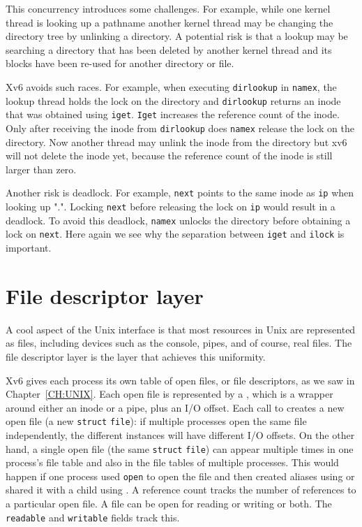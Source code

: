This concurrency introduces some challenges. For example, while one kernel
thread is looking up a pathname another kernel thread may be changing the
directory tree by unlinking a directory.  A potential risk is that a lookup
may be searching a directory that has been deleted by another kernel thread and
its blocks have been re-used for another directory or file.

Xv6 avoids such races.  For example, when executing
\lstinline{dirlookup}
in
\lstinline{namex},
the lookup thread holds the lock on the directory and
\lstinline{dirlookup}
returns an inode that was obtained using
\lstinline{iget}.
\lstinline{Iget}
increases the reference count of the inode.  Only after receiving the
inode from
\lstinline{dirlookup}
does
\lstinline{namex}
release the lock on the directory.  Now another thread may unlink the inode from
the directory but xv6 will not delete the inode yet, because the reference count
of the inode is still larger than zero.

Another risk is deadlock.  For example,
\lstinline{next}
points to the same inode as
\lstinline{ip}
when looking up ".".
Locking
\lstinline{next}
before releasing the lock on
\lstinline{ip}
would result in a deadlock.
To avoid this deadlock,
\lstinline{namex}
unlocks the directory before obtaining a lock on
\lstinline{next}.
Here again we see why the separation between
\lstinline{iget}
and
\lstinline{ilock}
is important.
\section{File descriptor layer}

A cool aspect of the Unix interface is that most resources in Unix are
represented as files, including devices such as the console, pipes, and of
course, real files.  The file descriptor layer is the layer that achieves this
uniformity.

Xv6 gives each process its own table of open files, or
file descriptors, as we saw in
Chapter~\ref{CH:UNIX}.
Each open file is represented by a
,
which is a wrapper around either an inode or a pipe,
plus an I/O offset.
Each call to 
creates a new open file (a new
\lstinline{struct}
\lstinline{file}):
if multiple processes open the same file independently,
the different instances will have different I/O offsets.
On the other hand, a single open file
(the same
\lstinline{struct}
\lstinline{file})
can appear
multiple times in one process's file table
and also in the file tables of multiple processes.
This would happen if one process used
\lstinline{open}
to open the file and then created aliases using
or shared it with a child using
.
A reference count tracks the number of references to
a particular open file.
A file can be open for reading or writing or both.
The
\lstinline{readable}
and
\lstinline{writable}
fields track this.

